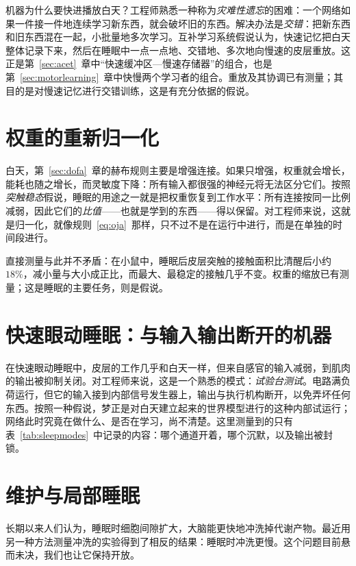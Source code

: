 机器为什么要快进播放白天？工程师熟悉一种称为\emph{灾难性遗忘}的困难：一个网络如果一件接一件地连续学习新东西，就会破坏旧的东西。解决办法是\emph{交错}：把新东西和旧东西混在一起，小批量地多次学习。互补学习系统假说\cite{McClelland1995}认为，快速记忆把白天整体记录下来，然后在睡眠中一点一点地、交错地、多次地向慢速的皮层重放。这正是第~\ref{sec:acet}~章中“快速缓冲区—慢速存储器”的组合，也是第~\ref{sec:motorlearning}~章中快慢两个学习者的组合。重放及其协调已有测量；其目的是对慢速记忆进行交错训练，这是有充分依据的假说。

\section{权重的重新归一化}

白天，第~\ref{sec:dofa}~章的赫布规则主要是增强连接。如果只增强，权重就会增长，能耗也随之增长，而灵敏度下降：所有输入都很强的神经元将无法区分它们。按照\emph{突触稳态}假说\cite{TononiCirelli2014}，睡眠的用途之一就是把权重恢复到工作水平：所有连接按同一比例减弱，因此它们的\emph{比值}——也就是学到的东西——得以保留。对工程师来说，这就是归一化，就像规则~\eqref{eq:oja}~那样，只不过不是在运行中进行，而是在单独的时间段进行。

直接测量与此并不矛盾：在小鼠中，睡眠后皮层突触的接触面积比清醒后小约 $18\%$，减小量与大小成正比，而最大、最稳定的接触几乎不变\cite{deVivo2017}。权重的缩放已有测量；这是睡眠的主要任务，则是假说。

\section{快速眼动睡眠：与输入输出断开的机器}

在快速眼动睡眠中，皮层的工作几乎和白天一样，但来自感官的输入减弱，到肌肉的输出被抑制关闭。对工程师来说，这是一个熟悉的模式：\emph{试验台测试}。电路满负荷运行，但它的输入接到内部信号发生器上，输出与执行机构断开，以免弄坏任何东西。按照一种假说，梦正是对白天建立起来的世界模型进行的这种内部试运行；网络此时究竟在做什么、是否在学习，尚不清楚。这里测量到的只有表~\ref{tab:sleepmodes}~中记录的内容：哪个通道开着，哪个沉默，以及输出被封锁。

\section{维护与局部睡眠}

长期以来人们认为，睡眠时细胞间隙扩大，大脑能更快地冲洗掉代谢产物\cite{Xie2013}。最近用另一种方法测量冲洗的实验得到了相反的结果：睡眠时冲洗更慢\cite{Miao2024}。这个问题目前悬而未决，我们也让它保持开放。

